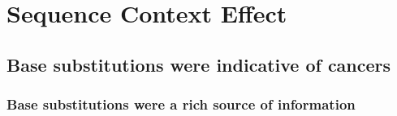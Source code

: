 \chapter{Sequence Context Effect}\label{sce}


\section{Base substitutions were indicative of cancers}\label{sce:spectra}

\subsection{Base substitutions were a rich source of information}


